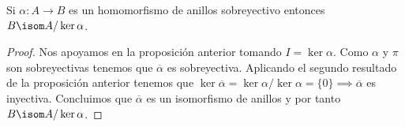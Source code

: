 \begin{thm}
	Si $\alpha: A \to B$ es un homomorfismo de anillos sobreyectivo entonces $B \isom A / \ker \alpha$.
\end{thm}

\begin{figure}[h]
	\centering
\end{figure}

\begin{proof}
	Nos apoyamos en la proposición anterior tomando $I = \ker \alpha$. Como $\alpha$ y $\pi$ son sobreyectivas tenemos que $\overline{\alpha}$ es sobreyectiva. Aplicando el segundo resultado de la proposición anterior tenemos que $\ker \overline{\alpha} = \ker \alpha / \ker \alpha = \{ 0\} \implies \overline{\alpha}$ es inyectiva. Concluimos que $\overline{\alpha}$ es un isomorfismo de anillos y por tanto $B \isom A / \ker \alpha$.
\end{proof}

